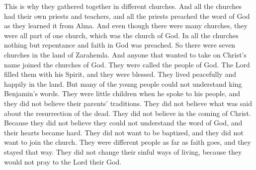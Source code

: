 This is why they gathered together in different churches. And all the churches had their own priests and teachers, and all the priests preached the word of God as they learned it from Alma.
\bverse \iffalse And thus, notwithstanding there being many churches they were all one church, yea, even the church of God; for there was nothing preached in all the churches except it were repentance and faith in God. \fi
And even though there were many churches, they were all part of one church, which was the church of God. In all the churches nothing but repentance and faith in God was preached.
\bverse \iffalse And now there were seven churches in the land of Zarahemla.  And it came to pass that whosoever were desirous to take upon them the name of Christ, or of God, they did join the churches of God; \fi
So there were seven churches in the land of Zarahemla. And anyone that wanted to take on Christ's name joined the churches of God.
\bverse \iffalse And they were called the people of God. And the Lord did pour out his Spirit upon them, and they were blessed, and prospered in the land. \fi
They were called the people of God. The Lord filled them with his Spirit, and they were blessed. They lived peacefully and happily in the land.
\bchapter
\bverse \iffalse Now it came to pass that there were many of the rising generation that could not understand the words of king Benjamin, being little children at the time he spake unto his people; and they did not believe the tradition of their fathers. \fi
But many of the young people could not understand king Benjamin's words. They were little children when he spoke to his people, and they did not believe their parents' traditions.
\bverse \iffalse They did not believe what had been said concerning the resurrection of the dead, neither did they believe concerning the coming of Christ. \fi
They did not believe what was said about the resurrection of the dead. They did not believe in the coming of Christ.
\bverse \iffalse And now because of their unbelief they could not understand the word of God; and their hearts were hardened. \fi
Because they did not believe they could not understand the word of God, and their hearts became hard.
\bverse \iffalse And they would not be baptized; neither would they join the church. And they were a separate people as to their faith, and remained so ever after, even in their carnal and sinful state; for they would not call upon the Lord their God. \fi
They did not want to be baptized, and they did not want to join the church. They were different people as far as faith goes, and they stayed that way. They did not change their sinful ways of living, because they would not pray to the Lord their God.

